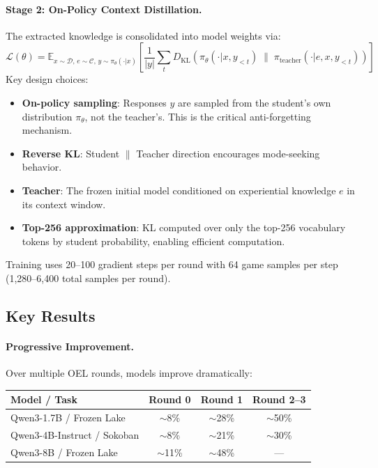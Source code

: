 \documentclass[11pt]{article}
\begin{document}
\paragraph{Stage 2: On-Policy Context Distillation.}
The extracted knowledge is consolidated into model weights via:
\[
\mathcal{L}(\theta) = \mathbb{E}_{x \sim \mathcal{D},\, e \sim \mathcal{C},\, y \sim \pi_\theta(\cdot|x)} \left[ \frac{1}{|y|} \sum_t D_{\mathrm{KL}}\!\left( \pi_\theta(\cdot|x, y_{<t}) \;\|\; \pi_{\mathrm{teacher}}(\cdot|e, x, y_{<t}) \right) \right]
\]
Key design choices:
\begin{itemize}
    \item \textbf{On-policy sampling}: Responses $y$ are sampled from the student's own distribution $\pi_\theta$, not the teacher's. This is the critical anti-forgetting mechanism.
    \item \textbf{Reverse KL}: Student $\|$ Teacher direction encourages mode-seeking behavior.
    \item \textbf{Teacher}: The frozen initial model conditioned on experiential knowledge $e$ in its context window.
    \item \textbf{Top-256 approximation}: KL computed over only the top-256 vocabulary tokens by student probability, enabling efficient computation.
\end{itemize}

Training uses 20--100 gradient steps per round with 64 game samples per step (1,280--6,400 total samples per round).

\subsection{Key Results}

\paragraph{Progressive Improvement.}
Over multiple OEL rounds, models improve dramatically:

\begin{center}
\begin{tabular}{lccc}
\toprule
\textbf{Model / Task} & \textbf{Round 0} & \textbf{Round 1} & \textbf{Round 2--3} \\
\midrule
Qwen3-1.7B / Frozen Lake & $\sim$8\% & $\sim$28\% & $\sim$50\% \\
Qwen3-4B-Instruct / Sokoban & $\sim$8\% & $\sim$21\% & $\sim$30\% \\
Qwen3-8B / Frozen Lake & $\sim$11\% & $\sim$48\% & --- \\
\bottomrule
\end{tabular}
\end{center}
\end{document}
